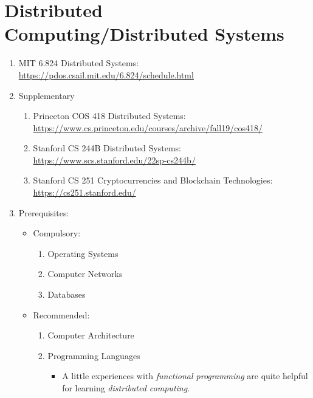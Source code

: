 \documentclass{article}
\begin{document}
\section{Distributed Computing/Distributed Systems}
\begin{enumerate}
    \item MIT 6.824 Distributed Systems:
    \href{https://pdos.csail.mit.edu/6.824/schedule.html}{https://pdos.csail.mit.edu/6.824/schedule.html}
    \item Supplementary
    \begin{enumerate}
        \item Princeton COS 418 Distributed Systems:\\
        \href{https://www.cs.princeton.edu/courses/archive/fall19/cos418/}{https://www.cs.princeton.edu/courses/archive/fall19/cos418/}
        \item Stanford CS 244B Distributed Systems:
        \href{https://www.scs.stanford.edu/22sp-cs244b/}{https://www.scs.stanford.edu/22sp-cs244b/}
        \item Stanford CS 251 Cryptocurrencies and Blockchain Technologies:\\
        \href{https://cs251.stanford.edu/}{https://cs251.stanford.edu/}
    \end{enumerate}
    
    \item Prerequisites:
    \begin{itemize}
        \item Compulsory:
        \begin{enumerate}
        \item Operating Systems
        \item Computer Networks
        \item Databases        
        \end{enumerate}
        \item Recommended:
        \begin{enumerate}
        \item Computer Architecture
        \item Programming Languages
        \begin{itemize}
            \item A little experiences with \emph{functional programming} are quite helpful for learning \emph{distributed computing}.
        \end{itemize}
        \end{enumerate} 
    \end{itemize}
\end{enumerate}
\end{document}
